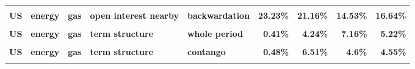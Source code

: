 \documentclass[
  authoryear,
  preprint,
  3p]{elsarticle}
\begin{document}
\begin{landscape}
\begin{longtable}[t]{>{}l>{}l>{}l>{}l>{}l>{}r>{}r>{}r>{}r}
\addlinespace
\textbf{\cellcolor{gray!10}{US}} & \textbf{\cellcolor{gray!10}{energy}} & \textbf{\cellcolor{gray!10}{gas}} & \textbf{\cellcolor{gray!10}{open interest nearby}} & \textbf{\cellcolor{gray!10}{whole period}} & \textcolor[HTML]{4285f4}{\textbf{\cellcolor{gray!10}{22.08\%}}} & \textcolor[HTML]{4285f4}{\textbf{\cellcolor{gray!10}{27.47\%}}} & \textcolor[HTML]{4285f4}{\textbf{\cellcolor{gray!10}{15.46\%}}} & \textcolor[HTML]{4285f4}{\textbf{\cellcolor{gray!10}{16.03\%}}}\\
\textbf{US} & \textbf{energy} & \textbf{gas} & \textbf{open interest nearby} & \textbf{backwardation} & \textcolor[HTML]{4285f4}{\textbf{23.23\%}} & \textcolor[HTML]{4285f4}{\textbf{21.16\%}} & \textcolor[HTML]{4285f4}{\textbf{14.53\%}} & \textcolor[HTML]{4285f4}{\textbf{16.64\%}}\\
\textbf{\cellcolor{gray!10}{US}} & \textbf{\cellcolor{gray!10}{energy}} & \textbf{\cellcolor{gray!10}{gas}} & \textbf{\cellcolor{gray!10}{open interest nearby}} & \textbf{\cellcolor{gray!10}{contango}} & \textcolor[HTML]{4285f4}{\textbf{\cellcolor{gray!10}{20.54\%}}} & \textcolor[HTML]{4285f4}{\textbf{\cellcolor{gray!10}{32.65\%}}} & \textcolor[HTML]{4285f4}{\textbf{\cellcolor{gray!10}{16.18\%}}} & \textcolor[HTML]{4285f4}{\textbf{\cellcolor{gray!10}{15.41\%}}}\\
\textbf{US} & \textbf{energy} & \textbf{gas} & \textbf{term structure} & \textbf{whole period} & \textcolor[HTML]{4285f4}{\textbf{0.41\%}} & \textcolor[HTML]{4285f4}{\textbf{4.24\%}} & \textcolor[HTML]{4285f4}{\textbf{7.16\%}} & \textcolor[HTML]{4285f4}{\textbf{5.22\%}}\\
\textbf{\cellcolor{gray!10}{US}} & \textbf{\cellcolor{gray!10}{energy}} & \textbf{\cellcolor{gray!10}{gas}} & \textbf{\cellcolor{gray!10}{term structure}} & \textbf{\cellcolor{gray!10}{backwardation}} & \textcolor[HTML]{4285f4}{\textbf{\cellcolor{gray!10}{0.36\%}}} & \textcolor[HTML]{4285f4}{\textbf{\cellcolor{gray!10}{2.03\%}}} & \textcolor[HTML]{4285f4}{\textbf{\cellcolor{gray!10}{11.66\%}}} & \textcolor[HTML]{4285f4}{\textbf{\cellcolor{gray!10}{5.9\%}}}\\
\addlinespace
\textbf{US} & \textbf{energy} & \textbf{gas} & \textbf{term structure} & \textbf{contango} & \textcolor[HTML]{4285f4}{\textbf{0.48\%}} & \textcolor[HTML]{4285f4}{\textbf{6.51\%}} & \textcolor[HTML]{4285f4}{\textbf{4.6\%}} & \textcolor[HTML]{4285f4}{\textbf{4.55\%}}\\
\textbf{\cellcolor{gray!10}{US}} & \textbf{\cellcolor{gray!10}{energy}} & \textbf{\cellcolor{gray!10}{petroleum}} & \textbf{\cellcolor{gray!10}{market}} & \textbf{\cellcolor{gray!10}{whole period}} & \textcolor[HTML]{4285f4}{\textbf{\cellcolor{gray!10}{28.98\%}}} & \textcolor[HTML]{4285f4}{\textbf{\cellcolor{gray!10}{35.97\%}}} & \textcolor[HTML]{4285f4}{\textbf{\cellcolor{gray!10}{48.3\%}}} & \textcolor[HTML]{4285f4}{\textbf{\cellcolor{gray!10}{31.91\%}}}\\

\end{longtable}
\end{landscape}
\end{document}
